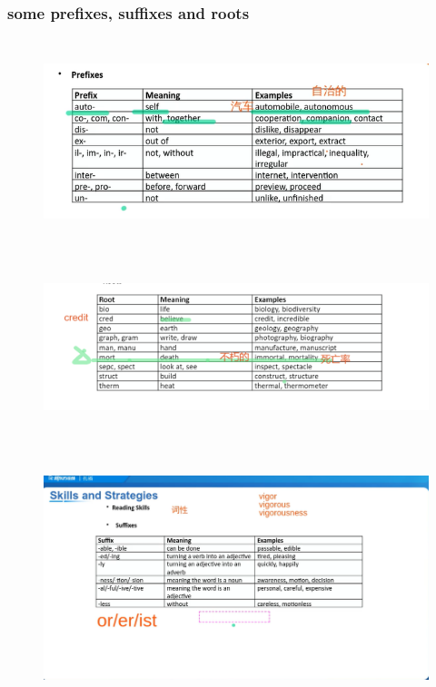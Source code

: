 \documentclass[a4paper, 10pt]{article}
\begin{document}
\subsubsection{some prefixes, suffixes and roots}
\begin{figure}[ht]
    \centering 
    \includegraphics[height=6cm,width=14.5cm]{pic2.png}
    
    
    \label{2}
    
    \end{figure}
    \begin{figure}[ht]
        \centering 
        \includegraphics[height=5cm,width=14.5cm]{pic3.png}
        
        
        \label{2}
        
        \end{figure}

        \begin{figure}[ht]
            \centering 
            \includegraphics[height=7.5cm,width=14.5cm]{pic4.png}
            
            
            \label{2}
            
            \end{figure}
\end{document}
